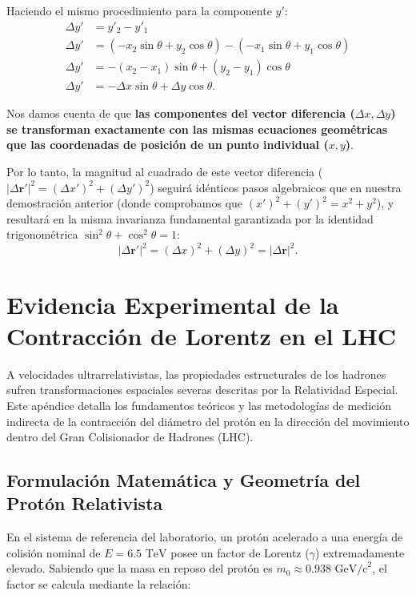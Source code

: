 \documentclass[11pt,a4paper]{book}
\begin{document}
Haciendo el mismo procedimiento para la componente $y'$:
\begin{align*}
    \Delta y' &= y'_2 - y'_1 \\
    \Delta y' &= (-x_2 \sin\theta + y_2 \cos\theta) - (-x_1 \sin\theta + y_1 \cos\theta) \\
    \Delta y' &= -(x_2 - x_1) \sin\theta + (y_2 - y_1) \cos\theta \\
    \Delta y' &= -\Delta x \sin\theta + \Delta y \cos\theta.
\end{align*}

Nos damos cuenta de que \textbf{las componentes del vector diferencia ($\Delta x, \Delta y$) se transforman exactamente con las mismas ecuaciones geométricas que las coordenadas de posición de un punto individual ($x, y$)}. 

Por lo tanto, la magnitud al cuadrado de este vector diferencia ($|\Delta\boldsymbol{r}'|^2 = (\Delta x')^2 + (\Delta y')^2$) seguirá idénticos pasos algebraicos que en nuestra demostración anterior (donde comprobamos que $(x')^2 + (y')^2 = x^2 + y^2$), y resultará en la misma invarianza fundamental garantizada por la identidad trigonométrica $\sin^2\theta + \cos^2\theta = 1$:
\begin{equation}
    |\Delta\boldsymbol{r}'|^2 = (\Delta x)^2 + (\Delta y)^2 = |\Delta\boldsymbol{r}|^2.
\end{equation}






\section{Evidencia Experimental de la Contracción de Lorentz en el LHC}
\label{apendice:contraccion_proton}

A velocidades ultrarrelativistas, las propiedades estructurales de los hadrones sufren transformaciones espaciales severas descritas por la Relatividad Especial. Este apéndice detalla los fundamentos teóricos y las metodologías de medición indirecta de la contracción del diámetro del protón en la dirección del movimiento dentro del Gran Colisionador de Hadrones (LHC).

\subsection{Formulación Matemática y Geometría del Protón Relativista}
En el sistema de referencia del laboratorio, un protón acelerado a una energía de colisión nominal de $E = 6.5\text{ TeV}$ posee un factor de Lorentz ($\gamma$) extremadamente elevado. Sabiendo que la masa en reposo del protón es $m_0 \approx 0.938\text{ GeV/c}^2$, el factor se calcula mediante la relación:
\end{document}
